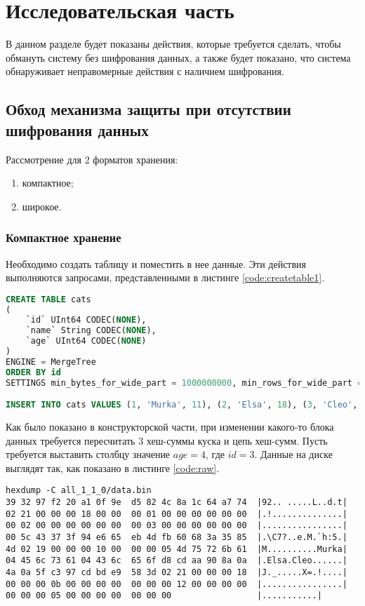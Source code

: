 \section{Исследовательская часть}

В данном разделе будет показаны действия, которые требуется сделать, чтобы обмануть систему без шифрования данных, а также будет показано, что система обнаруживает неправомерные действия с наличием шифрования.

\subsection{Обход механизма защиты при отсутствии шифрования данных}

Рассмотрение для 2 форматов хранения:
\begin{enumerate}
    \item компактное;
    \item широкое.
\end{enumerate}

\subsubsection{Компактное хранение}

Необходимо создать таблицу и поместить в нее данные. Эти действия выполняются запросами, представленными в листинге \ref{code:createtable1}.

\begin{lstlisting}[language=sql, label=code:createtable1, caption={Создание таблицы с компактным хранением.}]
CREATE TABLE cats
(
    `id` UInt64 CODEC(NONE),
    `name` String CODEC(NONE),
    `age` UInt64 CODEC(NONE)
)
ENGINE = MergeTree
ORDER BY id
SETTINGS min_bytes_for_wide_part = 1000000000, min_rows_for_wide_part = 1000000000, use_parts_chainer = 1

INSERT INTO cats VALUES (1, 'Murka', 11), (2, 'Elsa', 18), (3, 'Cleo', 5)
\end{lstlisting}

Как было показано в конструкторской части, при изменении какого-то блока данных требуется пересчитать 3 хеш-суммы куска и цепь хеш-сумм. Пусть требуется выставить столбцу значение $age = 4$, где $id = 3$. Данные на диске выглядят так, как показано в листинге \ref{code:raw}.

\pagebreak

\begin{lstlisting}[label=code:raw, caption={Данные записанного куска в сыром виде.}]
hexdump -C all_1_1_0/data.bin
39 32 97 f2 20 a1 0f 9e  d5 82 4c 8a 1c 64 a7 74  |92.. .....L..d.t|
02 21 00 00 00 18 00 00  00 01 00 00 00 00 00 00  |.!..............|
00 02 00 00 00 00 00 00  00 03 00 00 00 00 00 00  |................|
00 5c 43 37 3f 94 e6 65  eb 4d fb 60 68 3a 35 85  |.\C7?..e.M.`h:5.|
4d 02 19 00 00 00 10 00  00 00 05 4d 75 72 6b 61  |M..........Murka|
04 45 6c 73 61 04 43 6c  65 6f d8 cd aa 90 8a 0a  |.Elsa.Cleo......|
4a 0a 5f c3 97 cd bd e9  58 3d 02 21 00 00 00 18  |J._.....X=.!....|
00 00 00 0b 00 00 00 00  00 00 00 12 00 00 00 00  |................|
00 00 00 05 00 00 00 00  00 00 00                 |...........|
\end{lstlisting}

